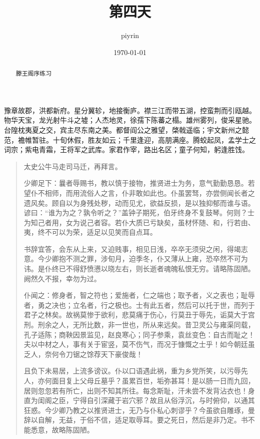 \documentclass{article}
\title{第四天}
\date{\today}
\author{piyrin}
\begin{document}
\maketitle
\newpage
\begin{abstract}
    滕王阁序练习
\end{abstract}
\newpage
{\color[rgb]{0.4,0.9,0.3}豫章故郡，洪都新府。}星分翼轸，地接衡庐。襟三江而带五湖，控蛮荆而引瓯越。物华天宝，龙光射牛斗之墟；人杰地灵，徐孺下陈蕃之榻。雄州雾列，俊采星驰。台隍枕夷夏之交，宾主尽东南之美。都督阎公之雅望，棨戟遥临；宇文新州之懿范，襜帷暂驻。十旬休假，胜友如云；千里逢迎，高朋满座。腾蛟起凤，孟学士之词宗；紫电青霜，王将军之武库。家君作宰，路出名区；童子何知，躬逢胜饯。

\begin{quotation}
    太史公牛马走司马迁，再拜言。

少卿足下：曩者辱赐书，教以慎于接物，推贤进士为务，意气勤勤恳恳。若望仆不相师，而用流俗人之言，仆非敢如此也。仆虽罢驽，亦尝侧闻长者之遗风矣。顾自以为身残处秽，动而见尤，欲益反损，是以独抑郁而谁与语。谚曰：“谁为为之？孰令听之？”盖钟子期死，伯牙终身不复鼓琴。何则？士为知己者用，女为说己者容。若仆大质已亏缺矣，虽材怀随、和，行若由、夷，终不可以为荣，适足以见笑而自点耳。

书辞宜答，会东从上来，又迫贱事，相见日浅，卒卒无须臾之闲，得竭志意。今少卿抱不测之罪，涉旬月，迫季冬，仆又薄从上雍，恐卒然不可为讳。是仆终已不得舒愤懑以晓左右，则长逝者魂魄私恨无穷。请略陈固陋。阙然久不报，幸勿为过。

仆闻之：修身者，智之符也；爱施者，仁之端也；取予者，义之表也；耻辱者，勇之决也；立名者，行之极也。士有此五者，然后可以托于世，而列于君子之林矣。故祸莫惨于欲利，悲莫痛于伤心，行莫丑于辱先，诟莫大于宫刑。刑余之人，无所比数，非一世也，所从来远矣。昔卫灵公与雍渠同载，孔子适陈；商鞅因景监见，赵良寒心；同子参乘，袁丝变色：自古而耻之！夫以中材之人，事有关于宦竖，莫不伤气，而况于慷慨之士乎！如今朝廷虽乏人，奈何令刀锯之馀荐天下豪俊哉！

且负下未易居，上流多谤议。仆以口语遇此祸，重为乡党所笑，以污辱先人，亦何面目复上父母丘墓乎？虽累百世，垢弥甚耳！是以肠一日而九回，居则忽忽若有所亡，出则不知其所往。每念斯耻，汗未尝不发背沾衣也！身直为闺阁之臣，宁得自引深藏于岩穴邪？故且从俗浮沉，与时俯仰，以通其狂惑。今少卿乃教之以推贤进士，无乃与仆私心刺谬乎？今虽欲自雕琢，曼辞以自解，无益，于俗不信，适足取辱耳。要之死日，然后是非乃定。书不能悉意，故略陈固陋。


\end{quotation}
\end{document}
